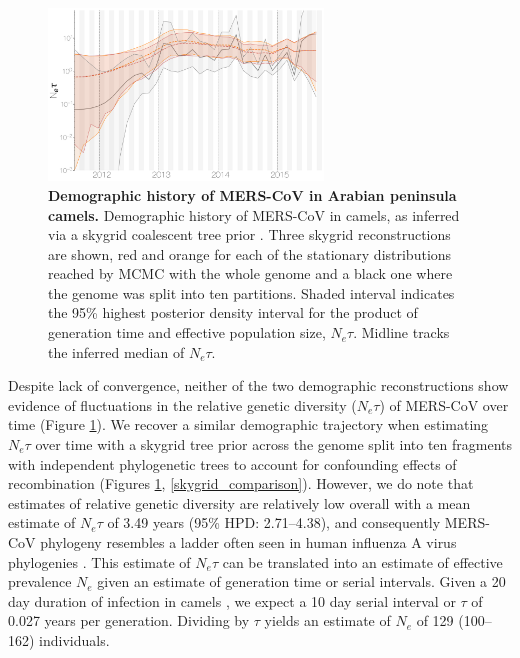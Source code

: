 \documentclass[11pt,oneside,letterpaper]{article}
\begin{document}
\begin{figure}[h]
\centering
	\includegraphics[width=0.65\textwidth]{figures/mers_skygrid.png}
	\caption{\textbf{Demographic history of MERS-CoV in Arabian peninsula camels.}
Demographic history of MERS-CoV in camels, as inferred via a skygrid coalescent tree prior \citep{gill_2013}.
Three skygrid reconstructions are shown, red and orange for each of the stationary distributions reached by MCMC with the whole genome and a black one where the genome was split into ten partitions.
Shaded interval indicates the 95\% highest posterior density interval for the product of generation time and effective population size, $N_{e}\tau$.
Midline tracks the inferred median of $N_{e}\tau$.
	}
	\label{skygrid}
\end{figure}

Despite lack of convergence, neither of the two demographic reconstructions show evidence of fluctuations in the relative genetic diversity ($N_e \tau$) of  MERS-CoV over time (Figure \ref{skygrid}).
We recover a similar demographic trajectory when estimating $N_{e}\tau$ over time with a skygrid tree prior across the genome split into ten fragments with independent phylogenetic trees to account for confounding effects of recombination (Figures \ref{skygrid}, \ref{skygrid_comparison}).
However, we do note that estimates of relative genetic diversity are relatively low overall with a mean estimate of $N_e\tau$ of 3.49 years (95\% HPD: 2.71--4.38), and consequently MERS-CoV phylogeny resembles a ladder often seen in human influenza A virus phylogenies \citep{bedford_strength_2011}.
This estimate of $N_e\tau$ can be translated into an estimate of effective prevalence $N_e$ given an estimate of generation time or serial intervals.
Given a 20 day duration of infection in camels \citep{adney_replication_2014}, we expect a 10 day serial interval or $\tau$ of 0.027 years per generation.
Dividing by $\tau$ yields an estimate of $N_e$ of 129 (100--162) individuals.
\end{document}
